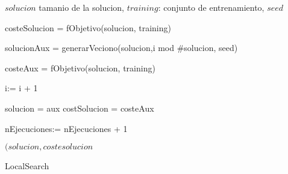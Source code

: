 \documentclass{article}
\begin{document}
\begin{algorithm}
\begin{algorithmic}[1]
    \REQUIRE $solucion$ tamanio de la solucion, $training$: conjunto de entrenamiento, $seed$



    \REPEAT
	\STATE costeSolucion = fObjetivo(solucion, training)

	\REPEAT
		\STATE solucionAux = generarVeciono(solucion,i mod \#solucion, seed)

		\STATE costeAux = fObjetivo(solucion, training)

		\STATE i:= i + 1
	
		\STATE solucion = aux
		\STATE costSolucion = costeAux
	\ENDIF

	\STATE nEjecuciones:= nEjecuciones + 1
	
		

    \RETURN $(solucion, costesolucion$
\end{algorithmic}
\caption{LocalSearch}
\end{algorithm}
\end{document}
